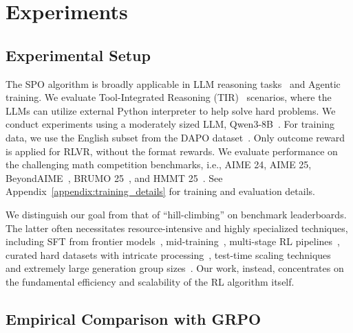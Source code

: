 \section{Experiments}\label{sec:exps}

\subsection{Experimental Setup}
The SPO algorithm is broadly applicable in LLM reasoning tasks~\cite{R1} and Agentic training. We evaluate Tool-Integrated Reasoning (TIR)~\cite{feng2025retool,aspo} scenarios, where the LLMs can utilize external Python interpreter to help solve hard problems. We conduct experiments using a moderately sized LLM, Qwen3-8B~\cite{qwen3}. 
For training data, we use the English subset from the DAPO dataset~\cite{DAPO}. Only outcome reward is applied for RLVR, without the format rewards. We evaluate performance on the challenging math competition benchmarks, i.e., AIME 24, AIME 25, BeyondAIME~\cite{seed1.5}, BRUMO 25~\cite{matharena}, and HMMT 25~\cite{matharena}. 
See Appendix~\ref{appendix:training_details} for training and evaluation details.



We distinguish our goal from that of ``hill-climbing'' on benchmark leaderboards. The latter often necessitates resource-intensive and highly specialized techniques, including SFT from frontier models~\cite{liu2025acereason11}, mid-training~\cite{wang2025octothinker}, multi-stage RL pipelines~\cite{deepscaler2025,he2025skywork,chen2025acereason}, curated hard datasets with intricate processing~\cite{Polaris2025, shang2025rstar2}, test-time scaling techniques~\cite{fu2025deep} and extremely large generation group sizes~\cite{zeng2025glm}. Our work, instead, concentrates on the fundamental efficiency and scalability of the RL algorithm itself. 



\subsection{Empirical Comparison with GRPO}

